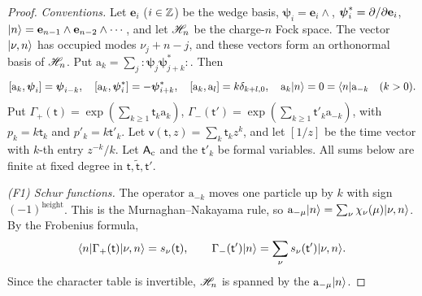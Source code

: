 \begin{proof}
\emph{Conventions.} Let $\mathbf{e}_i$ ($i\in\mathbb{Z}$) be the wedge basis, $\boldsymbol{\psi}_i=\mathbf{e}_i\wedge$, $\boldsymbol{\psi}^*_i=\partial/\partial\mathbf{e}_i$, $\lvert n\rangle=\mathbf{e}_{n-1}\wedge\mathbf{e}_{n-2}\wedge\cdots$, and let $\mathscr{H}_n$ be the charge-$n$ Fock space. The vector $\lvert \nu,n\rangle$ has occupied modes $\nu_j+n-j$, and these vectors form an orthonormal basis of $\mathscr{H}_n$. Put $\mathrm{a}_k=\sum_j:\!\boldsymbol{\psi}_j\boldsymbol{\psi}^*_{j+k}\!:$. Then
\[
[\mathrm{a}_k,\boldsymbol{\psi}_i]=\boldsymbol{\psi}_{i-k},\quad[\mathrm{a}_k,\boldsymbol{\psi}^*_i]=-\boldsymbol{\psi}^*_{i+k},\quad[\mathrm{a}_k,\mathrm{a}_l]=k\delta_{k+l,0},\quad\mathrm{a}_k\lvert n\rangle=0=\langle n\rvert\mathrm{a}_{-k}\quad(k>0).
\]
Put $\Gamma_+(\mathsf{t})=\exp(\sum_{k\geq 1}\mathsf{t}_k\mathrm{a}_k)$, $\Gamma_-(\mathsf{t}')=\exp(\sum_{k\geq 1}\mathsf{t}'_k\mathrm{a}_{-k})$, with $p_k=k\mathsf{t}_k$ and $p'_k=k\mathsf{t}'_k$. Let $\mathsf{v}(\mathsf{t},z)=\sum_k\mathsf{t}_kz^k$, and let $[1/z]$ be the time vector with $k$-th entry $z^{-k}/k$. Let $\mathsf{A}_{\mathrm{c}}$ and the $\mathsf{t}'_k$ be formal variables. All sums below are finite at fixed degree in $\mathsf{t},\widetilde{\mathsf{t}},\mathsf{t}'$.

\emph{(F1) Schur functions.} The operator $\mathrm{a}_{-k}$ moves one particle up by $k$ with sign $(-1)^{\mathrm{height}}$. This is the Murnaghan--Nakayama rule, so $\mathrm{a}_{-\mu}\lvert n\rangle=\sum_\nu\chi_\nu(\mu)\lvert \nu,n\rangle$. By the Frobenius formula,
\[
\langle n\rvert\Gamma_+(\mathsf{t})\lvert \nu,n\rangle=s_\nu(\mathsf{t}),\qquad\Gamma_-(\mathsf{t}')\lvert n\rangle=\sum_\nu s_\nu(\mathsf{t}')\lvert \nu,n\rangle.
\]
Since the character table is invertible, $\mathscr{H}_n$ is spanned by the $\mathrm{a}_{-\mu}\lvert n\rangle$.


\end{proof}
